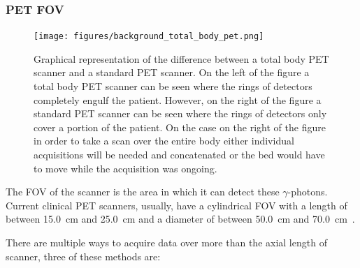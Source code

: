             \subsubsection{PET FOV} \label{sec:pet_fov}
                \begin{figure}
                    \centering
                    
                    \texttt{[image: figures/background\_total\_body\_pet.png]}
                    
                    \captionsetup{singlelinecheck=false, justification=raggedright}
                    \caption{Graphical representation of the difference between a total body \gls{PET} scanner and a standard \gls{PET} scanner. On the left of the figure a total body \gls{PET} scanner can be seen where the rings of detectors completely engulf the patient. However, on the right of the figure a standard \gls{PET} scanner can be seen where the rings of detectors only cover a portion of the patient. On the case on the right of the figure in order to take a scan over the entire body either individual acquisitions will be needed and concatenated or the bed would have to move while the acquisition was ongoing.} \label{fig:pet_fov_total_body_pet}
                \end{figure}
                
                The \gls{FOV} of the scanner is the area in which it can detect these $\gamma$-photons. Current clinical \gls{PET} scanners, usually, have a cylindrical \gls{FOV} with a length of between \SI{15.0}{\centi\metre} and \SI{25.0}{\centi\metre} and a diameter of between \SI{50.0}{\centi\metre} and \SI{70.0}{\centi\metre}~.
                
                There are multiple ways to acquire data over more than the axial length of scanner, three of these methods are:
                
